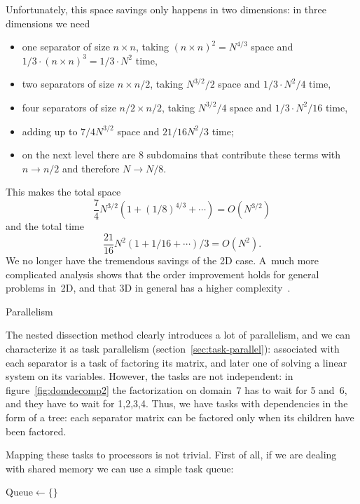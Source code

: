 Unfortunately, this space savings only happens in two dimensions: in three
dimensions we need
\begin{itemize}
\item one separator of size $n\times n$, taking $(n\times
  n)^2=N^{4/3}$ space and $1/3\cdot (n\times n)^3=1/3\cdot N^2$ time,
\item two separators of size $n\times n/2$, taking $N^{3/2}/2$ space and
  $1/3\cdot N^2/4$ time,
\item four separators of size $n/2\times n/2$, taking $N^{3/2}/4$ space
  and $1/3\cdot N^2/16$ time,
\item adding up to $7/4 N^{3/2}$ space and $21/16 N^2/3$ time;
\item on the next level there are 8 subdomains that contribute these
  terms with $n\rightarrow n/2$ and therefore $N\rightarrow N/8$.
\end{itemize}
This makes the total space
\[ \frac{7}{4}N^{3/2}(1+(1/8)^{4/3}+\cdots)=O(N^{3/2}) \]
and the total time
\[ \frac{21}{16}N^2(1+1/16+\cdots)/3=O(N^2). \]
We no longer have the tremendous savings of the 2D case.
A~much more complicated analysis shows that the
order improvement holds for general problems in~2D, and that 3D in
general has a higher
complexity~\cite{LiRoTa:dissection}.

 {Parallelism}

The nested dissection method clearly introduces a lot of parallelism,
and we can characterize it as task parallelism
(section~\ref{sec:task-parallel}): associated with each separator is a
task of factoring its matrix, and later one of solving a linear system
on its variables.  However, the tasks are not independent: in
figure~\ref{fig:domdecomp2} the factorization on domain~7 has to wait
for 5 and~6, and they have to wait for 1,2,3,4.
Thus, we have tasks with dependencies in the form of a tree: each
separator matrix can be factored only when its children have been
factored.

Mapping these tasks to processors is not trivial. First of all, if we
are dealing with shared memory we can use a simple task queue:

\begin{displayalgorithm}
  $\mbox{Queue}\leftarrow\{\}$\;
        {
        }
\end{displayalgorithm}

